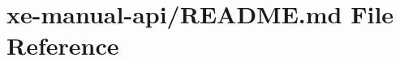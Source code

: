 \hypertarget{xe-manual-api_2README_8md}{}\section{xe-\/manual-\/api/\+R\+E\+A\+D\+ME.md File Reference}
\label{xe-manual-api_2README_8md}

